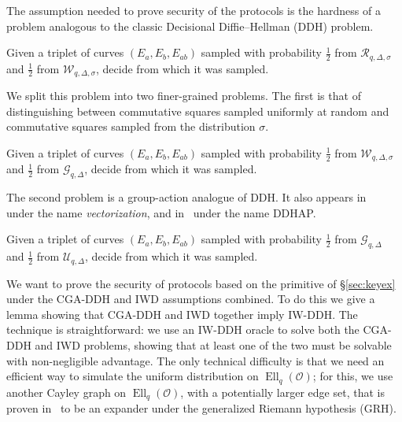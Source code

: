 \documentclass{llncs}
\newcommand{\Cl}{\mathcal{C}}
\renewcommand{\O}{\mathcal{O}}
\newcommand{\suchthat}{\,\middle\vert\,}
\renewcommand{\frak}{\mathfrak}
\newcommand{\rand}[1]{\overset{#1}{∈}}
\newcommand{\uni}{\rand{R}}
\DeclareMathOperator{\Ell}{Ell}
\begin{document}
The assumption needed to prove security of the protocols is 
the hardness of a problem analogous to 
the classic Decisional Diffie--Hellman (DDH) problem.

\begin{definition}
    Given a triplet of curves $(E_a,E_b,E_{ab})$
    sampled with probability $\frac{1}{2}$ 
    from $\mathcal{R}_{q,\Delta,\sigma}$
    and $\frac{1}{2}$ from $\mathcal{W}_{q,\Delta,\sigma}$,
    decide from which it was sampled. 
\end{definition}

We split this problem into two finer-grained problems. 
The first is that of distinguishing between 
commutative squares sampled uniformly at random 
and commutative squares sampled from the distribution $σ$.

\begin{definition}
    Given a triplet of curves $(E_a,E_b,E_{ab})$
    sampled with probability 
    $\frac{1}{2}$ from $\mathcal{W}_{q,Δ,σ}$
    and 
    $\frac{1}{2}$ from $\mathcal{G}_{q,Δ}$,
    decide from which it was sampled.
\end{definition}

The second problem is a group-action analogue of DDH.
It also appears in~\cite{cryptoeprint:2006:291} under the
name \emph{vectorization}, and in~\cite{Stol,Stolbunov2012} under the
name DDHAP.
 
\begin{definition}
    Given a triplet of curves $(E_a,E_b,E_{ab})$
    sampled with probability 
    $\frac{1}{2}$ from $\mathcal{G}_{q,Δ}$
    and 
    $\frac{1}{2}$ from $\mathcal{U}_{q,Δ}$,
    decide from which it was sampled.
\end{definition}

We want to prove the security of protocols based on the primitive of
\S\ref{sec:keyex} under the CGA-DDH and IWD assumptions
combined. To do this we give a lemma showing that CGA-DDH and IWD
together imply IW-DDH. The technique is straightforward: we use an
IW-DDH oracle to solve both the CGA-DDH and IWD problems, showing that
at least one of the two must be solvable with non-negligible
advantage. The only technical difficulty is that we need
an efficient way to simulate the uniform distribution on $\Ell_q(\O)$;
for this, we use another Cayley graph on $\Ell_q(\O)$,
with a potentially larger edge set, that is proven
in~\cite{jao+miller+venkatesan09} to be an expander 
under the generalized Riemann hypothesis (GRH).
\end{document}

